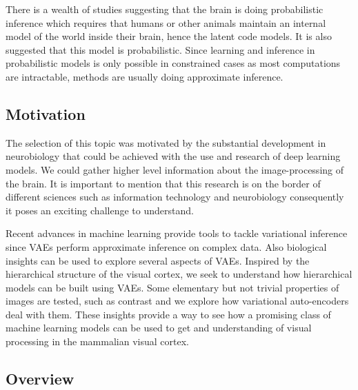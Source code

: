 \documentclass[12pt, english]{article}
\begin{document}
\vspace{4mm}

\par There is a wealth of studies suggesting that the brain is doing probabilistic inference which requires that humans or other animals maintain an internal model of the world inside their brain, hence the latent code models. It is also suggested that this model is probabilistic. Since learning and inference in probabilistic models is only possible in constrained cases as most computations are intractable, methods are usually doing approximate inference.

\vspace{7mm}

\subsection{Motivation}

\vspace{7mm}

\par The selection of this topic was motivated by the substantial development in neurobiology that could be achieved with the use and research of deep learning models. We could gather higher level information about the image-processing of the brain. It is important to mention that this research is on the border of different sciences such as information technology and neurobiology consequently it poses an exciting challenge to understand.

\vspace{4mm}

\par Recent advances in machine learning provide tools to tackle variational inference since VAEs perform approximate inference on complex data. Also biological insights can be used to explore several aspects of VAEs. Inspired by the hierarchical structure of the visual cortex, we seek to understand how hierarchical models can be built using VAEs. Some elementary but not trivial properties of images are tested, such as contrast and we explore how variational auto-encoders deal with them. These insights provide a way to see how a promising class of machine learning models can be used to get and understanding of visual processing in the mammalian visual cortex.

\vspace{7mm}

\subsection{Overview}
\end{document}

